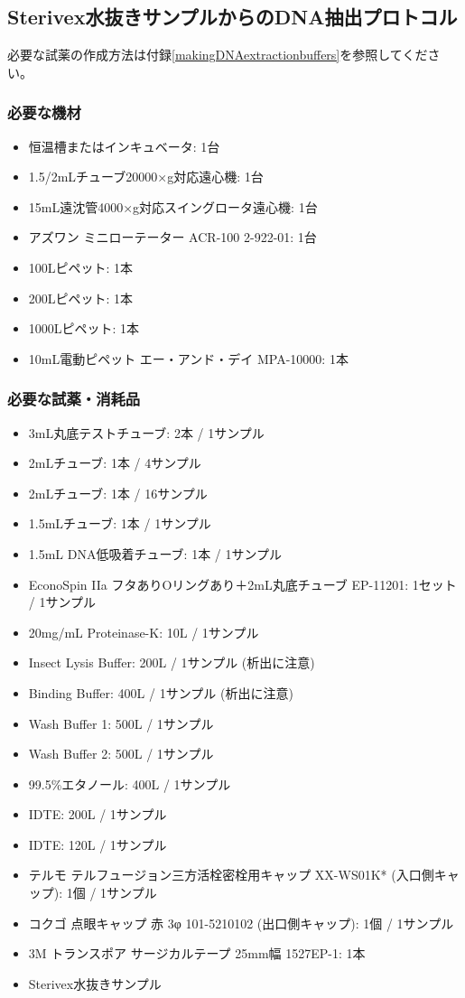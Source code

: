 \documentclass[titlepage,10pt,a4paper]{jsbook}
\begin{document}
\subsection{Sterivex水抜きサンプルからのDNA抽出プロトコル}

必要な試薬の作成方法は付録\ref{makingDNAextractionbuffers}を参照してください。

\subsubsection{必要な機材}
\begin{itemize}
\item 恒温槽またはインキュベータ: 1台
\item 1.5/2mLチューブ20000×g対応遠心機: 1台
\item 15mL遠沈管4000×g対応スイングロータ遠心機: 1台
\item アズワン ミニローテーター ACR-100 2-922-01: 1台
\item 100{\textmu}Lピペット: 1本
\item 200{\textmu}Lピペット: 1本
\item 1000{\textmu}Lピペット: 1本
\item 10mL電動ピペット エー・アンド・デイ MPA-10000: 1本
\end{itemize}

\subsubsection{必要な試薬・消耗品}
\begin{itemize}
\item 3mL丸底テストチューブ: 2本 / 1サンプル
\item 2mLチューブ: 1本 / 4サンプル
\item 2mLチューブ: 1本 / 16サンプル
\item 1.5mLチューブ: 1本 / 1サンプル
\item 1.5mL DNA低吸着チューブ: 1本 / 1サンプル
\item EconoSpin IIa フタありOリングあり＋2mL丸底チューブ EP-11201: 1セット / 1サンプル
\item 20mg/mL Proteinase-K: 10{\textmu}L / 1サンプル
\item Insect Lysis Buffer: 200{\textmu}L / 1サンプル (析出に注意)
\item Binding Buffer: 400{\textmu}L / 1サンプル (析出に注意)
\item Wash Buffer 1: 500{\textmu}L / 1サンプル
\item Wash Buffer 2: 500{\textmu}L / 1サンプル
\item 99.5\%エタノール: 400{\textmu}L / 1サンプル
\item IDTE: 200{\textmu}L / 1サンプル
\item IDTE: 120{\textmu}L / 1サンプル
\item テルモ テルフュージョン三方活栓密栓用キャップ XX-WS01K* (入口側キャップ): 1個 / 1サンプル
\item コクゴ 点眼キャップ 赤 3φ 101-5210102 (出口側キャップ): 1個 / 1サンプル
\item 3M トランスポア サージカルテープ 25mm幅 1527EP-1: 1本
\item Sterivex水抜きサンプル
\end{itemize}
\end{document}

